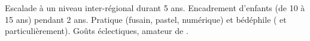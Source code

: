 \begin{rubric}{%
}

\entry*[Sport]
Escalade à un niveau inter-régional durant 5 ans. Encadrement d'enfants (de 10 à 15 ans) pendant 2 ans.
\entry*[Dessin]
Pratique (fusain, pastel, numérique) et bédéphile ( et  particulièrement).
 \entry*[Cinéma] Goûts éclectiques, amateur de .

\end{rubric}


